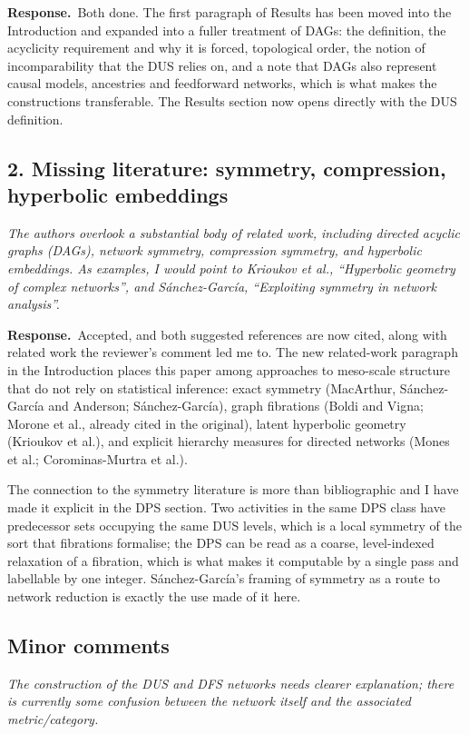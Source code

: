 \documentclass[11pt,a4paper]{article}
\newcommand{\rev}[1]{\medskip\noindent\textit{#1}\par\medskip}
\newcommand{\reply}{\noindent\textbf{Response.}\ }
\begin{document}
\reply Both done. The first paragraph of Results has been moved into the
Introduction and expanded into a fuller treatment of DAGs: the definition, the
acyclicity requirement and why it is forced, topological order, the notion of
incomparability that the DUS relies on, and a note that DAGs also represent
causal models, ancestries and feedforward networks, which is what makes the
constructions transferable. The Results section now opens directly with the DUS
definition.

\subsection*{2. Missing literature: symmetry, compression, hyperbolic embeddings}

\rev{The authors overlook a substantial body of related work, including directed
acyclic graphs (DAGs), network symmetry, compression symmetry, and hyperbolic
embeddings. As examples, I would point to Krioukov et al., ``Hyperbolic geometry
of complex networks'', and S\'anchez-Garc\'ia, ``Exploiting symmetry in network
analysis''.}

\reply Accepted, and both suggested references are now cited, along with
related work the reviewer's comment led me to. The new related-work paragraph in
the Introduction places this paper among approaches to meso-scale structure that
do not rely on statistical inference: exact symmetry (MacArthur, S\'anchez-Garc\'ia
and Anderson; S\'anchez-Garc\'ia), graph fibrations (Boldi and Vigna; Morone et
al., already cited in the original), latent hyperbolic geometry (Krioukov et
al.), and explicit hierarchy measures for directed networks (Mones et al.;
Corominas-Murtra et al.).

The connection to the symmetry literature is more than bibliographic and I have
made it explicit in the DPS section. Two activities in the same DPS class have
predecessor sets occupying the same DUS levels, which is a local symmetry of the
sort that fibrations formalise; the DPS can be read as a coarse, level-indexed
relaxation of a fibration, which is what makes it computable by a single pass
and labellable by one integer. S\'anchez-Garc\'ia's framing of symmetry as a
route to network reduction is exactly the use made of it here.

\subsection*{Minor comments}

\rev{The construction of the DUS and DFS networks needs clearer explanation;
there is currently some confusion between the network itself and the associated
metric/category.}
\end{document}
